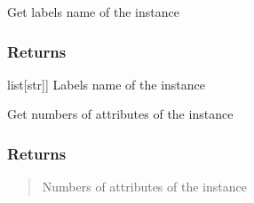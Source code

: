 \documentclass[letterpaper,10pt,english]{sphinxmanual}
\begin{document}
\begin{fulllineitems}
\begin{fulllineitems}
\begin{description}
\end{description}

\end{fulllineitems}


\begin{fulllineitems}
\label{\detokenize{data/_autosummary/miml.data.instance.Instance:miml.data.instance.Instance.get_labels_name}}
\pysigstartsignatures
{}
\pysigstopsignatures
\sphinxAtStartPar
Get labels name of the instance


\subsubsection{Returns}
\label{\detokenize{data/_autosummary/miml.data.instance.Instance:id8}}\begin{description}
\sphinxlineitem{labels}{[}list{[}str{]}{]}
\sphinxAtStartPar
Labels name of the instance

\end{description}

\end{fulllineitems}


\begin{fulllineitems}
\label{\detokenize{data/_autosummary/miml.data.instance.Instance:miml.data.instance.Instance.get_number_attributes}}
\pysigstartsignatures
{}
\pysigstopsignatures
\sphinxAtStartPar
Get numbers of attributes of the instance


\subsubsection{Returns}
\label{\detokenize{data/_autosummary/miml.data.instance.Instance:id9}}\begin{quote}
\begin{description}
\sphinxAtStartPar
Numbers of attributes of the instance


\end{description}
\end{quote}
\end{fulllineitems}
\end{fulllineitems}
\end{document}
